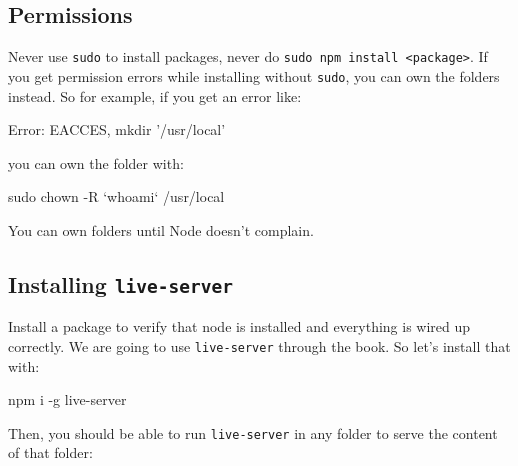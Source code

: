 \documentclass[12pt,]{article}
\newenvironment{Shaded}{}{}
\newcommand{\KeywordTok}[1]{\textcolor[rgb]{0.00,0.00,1.00}{{#1}}}
\newcommand{\StringTok}[1]{\textcolor[rgb]{0.00,0.50,0.50}{{#1}}}
\newcommand{\OtherTok}[1]{\textcolor[rgb]{1.00,0.25,0.00}{{#1}}}
\newcommand{\NormalTok}[1]{{#1}}
\begin{document}
\subsection{Permissions}\label{permissions}

Never use \texttt{sudo} to install packages, never do
\texttt{sudo\ npm\ install\ \textless{}package\textgreater{}}. If you
get permission errors while installing without \texttt{sudo}, you can
own the folders instead. So for example, if you get an error like:

\begin{Shaded}
\begin{Highlighting}[numbers=left,,]
\KeywordTok{Error}\NormalTok{: EACCES, mkdir }\StringTok{'/usr/local'}
\end{Highlighting}
\end{Shaded}

you can own the folder with:

\begin{Shaded}
\begin{Highlighting}[numbers=left,,]
\KeywordTok{sudo} \NormalTok{chown -R }\KeywordTok{`whoami`} \NormalTok{/usr/local}
\end{Highlighting}
\end{Shaded}

You can own folders until Node doesn't complain.

\subsection{\texorpdfstring{Installing
\texttt{live-server}}{Installing live-server}}\label{installing-live-server}

Install a package to verify that node is installed and everything is
wired up correctly. We are going to use \texttt{live-server} through the
book. So let's install that with:

\begin{Shaded}
\begin{Highlighting}[numbers=left,,]
\KeywordTok{npm} \NormalTok{i -g live-server}
\end{Highlighting}
\end{Shaded}

Then, you should be able to run \texttt{live-server} in any folder to
serve the content of that folder:

\begin{Shaded}
\end{Shaded}
\end{document}
